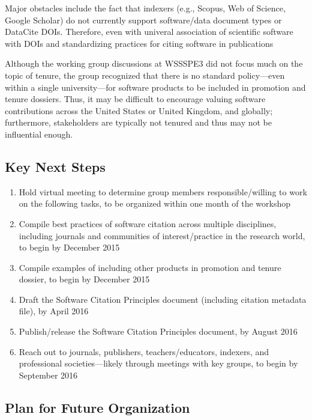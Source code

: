 Major obstacles include the fact that indexers (e.g., Scopus, Web of Science, 
Google Scholar) do not currently support software/data document types or 
DataCite DOIs.
Therefore, even with univeral association of scientific software with DOIs 
and standardizing practices for citing software in publications

Although the working group discussions at WSSSPE3 did not focus much on the 
topic of tenure, the group recognized that there is no standard policy---even 
within a single university---for software products to be included in 
promotion and tenure dossiers.
Thus, it may be difficult to encourage valuing software contributions across 
the United States or United Kingdom, and globally; furthermore, stakeholders 
are typically not tenured and thus may not be influential enough.

\subsection{Key Next Steps}
\label{SC:next-steps}

\begin{enumerate}
\item Hold virtual meeting to determine group members responsible\slash willing to work on the following tasks, to be organized within one month of the workshop
\item Compile best practices of software citation across multiple disciplines, including journals and communities of interest\slash practice in the research world, to begin by December 2015
\item Compile examples of including other products in promotion and tenure dossier, to begin by December 2015
\item Draft the Software Citation Principles document (including citation metadata file), by April 2016
\item Publish\slash release the Software Citation Principles document, by August 2016
\item Reach out to journals, publishers, teachers\slash educators, indexers, and professional societies---likely through meetings with key groups, to begin by September 2016

\end{enumerate}

\subsection{Plan for Future Organization}
\label{SC:plan}

